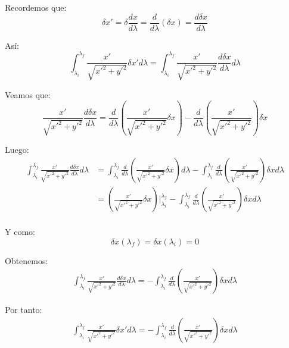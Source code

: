 \documentclass[12pt]{report}
\begin{document}
Recordemos que:
	\begin{equation*}
		\delta x'= \delta \frac{dx}{d\lambda} = \frac{d}{d\lambda} \left( \delta x \right) = \frac{d \delta x}{d\lambda}
	\end{equation*}

As\'i:
	\begin{equation*}
		\int^{\lambda_{f}}_{\lambda_{i}}  \frac{x'}{\sqrt{ x'^{2} + y'^{2} }} \delta x' d\lambda =  \int^{\lambda_{f}}_{\lambda_{i}}  \frac{x'}{\sqrt{ x'^{2} + y'^{2} }} \frac{d \delta x}{d\lambda} d\lambda 
	\end{equation*}

Veamos que:
	\begin{equation*}
		\frac{x'}{\sqrt{ x'^{2} + y'^{2} }} \frac{d \delta x}{d\lambda} = \frac{d}{d\lambda} \left( \frac{x'}{\sqrt{ x'^{2} + y'^{2} }} \delta x  \right) 
																		  - \frac{d}{d\lambda} \left( \frac{x'}{\sqrt{ x'^{2} + y'^{2} }}  \right) \delta x 
	\end{equation*}

Luego:
	\begin{align*}
		\int^{\lambda_{f}}_{\lambda_{i}}  \frac{x'}{\sqrt{ x'^{2} + y'^{2} }} \frac{d \delta x}{d\lambda} d\lambda 
		  &= \int^{\lambda_{f}}_{\lambda_{i}}  \frac{d}{d\lambda} \left( \frac{x'}{\sqrt{ x'^{2} + y'^{2} }} \delta x  \right) d\lambda
	   	  - \int^{\lambda_{f}}_{\lambda_{i}}  \frac{d}{d\lambda} \left( \frac{x'}{\sqrt{ x'^{2} + y'^{2} }}  \right) \delta x d\lambda \\
	   	  &= \left( \frac{x'}{\sqrt{ x'^{2} + y'^{2} }} \delta x \right) \Big|^{\lambda_{f}}_{\lambda_{i}} - \int^{\lambda_{f}}_{\lambda_{i}}  \frac{d}{d\lambda} \left( \frac{x'}{\sqrt{ x'^{2} + y'^{2} }}  \right) \delta x d\lambda \\
	\end{align*}

Y como:
	\begin{equation*}
		\delta x (\lambda_{f}) = \delta x (\lambda_{i}) = 0 
	\end{equation*}

Obtenemos:
	\begin{align*}
		\int^{\lambda_{f}}_{\lambda_{i}}  \frac{x'}{\sqrt{ x'^{2} + y'^{2} }} \frac{d \delta x}{d\lambda} d\lambda = - \int^{\lambda_{f}}_{\lambda_{i}}  \frac{d}{d\lambda} \left( \frac{x'}{\sqrt{ x'^{2} + y'^{2} }}  \right) \delta x d\lambda 
	\end{align*}

Por tanto:
	\begin{align*}
		\int^{\lambda_{f}}_{\lambda_{i}}  \frac{x'}{\sqrt{ x'^{2} + y'^{2} }} \delta x' d\lambda = - \int^{\lambda_{f}}_{\lambda_{i}}  \frac{d}{d\lambda} \left( \frac{x'}{\sqrt{ x'^{2} + y'^{2} }}  \right) \delta x d\lambda 
	\end{align*}
	
\end{document}
